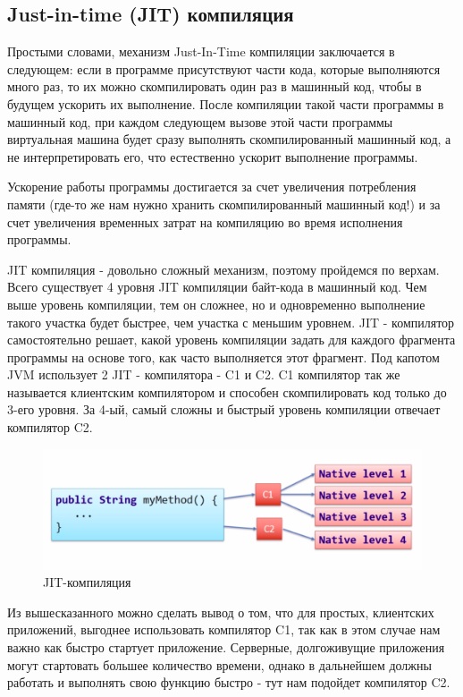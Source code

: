 \documentclass[]{scrartcl}
\begin{document}
\subsection{Just-in-time (JIT) компиляция}

Простыми словами, механизм Just-In-Time компиляции заключается в следующем: если в программе присутствуют части кода, которые выполняются много раз, то их можно скомпилировать один раз в машинный код, чтобы в будущем ускорить их выполнение. После компиляции такой части программы в машинный код, при каждом следующем вызове этой части программы виртуальная машина будет сразу выполнять скомпилированный машинный код, а не интерпретировать его, что естественно ускорит выполнение программы.

Ускорение работы программы достигается за счет увеличения потребления памяти (где-то же нам нужно хранить скомпилированный машинный код!) и за счет увеличения временных затрат на компиляцию во время исполнения программы.

JIT компиляция - довольно сложный механизм, поэтому пройдемся по верхам. Всего существует 4 уровня JIT компиляции байт-кода в машинный код. Чем выше уровень компиляции, тем он сложнее, но и одновременно выполнение такого участка будет быстрее, чем участка с меньшим уровнем. JIT - компилятор самостоятельно решает, какой уровень компиляции задать для каждого фрагмента программы на основе того, как часто выполняется этот фрагмент. Под капотом JVM использует 2 JIT - компилятора - C1 и C2. C1 компилятор так же называется клиентским компилятором и способен скомпилировать код только до 3-его уровня. За 4-ый, самый сложны и быстрый уровень компиляции отвечает компилятор C2.

\begin{figure}[h!]
	\includegraphics[width=\linewidth]{JIT.png}
	\caption{JIT-компиляция}
\end{figure}

Из вышесказанного можно сделать вывод о том, что для простых, клиентских приложений, выгоднее использовать компилятор C1, так как в этом случае нам важно как быстро стартует приложение. Серверные, долгоживущие приложения могут стартовать большее количество времени, однако в дальнейшем должны работать и выполнять свою функцию быстро - тут нам подойдет компилятор C2.
\end{document}
